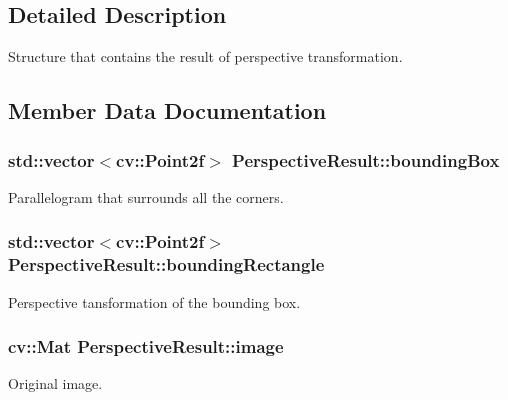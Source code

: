 \subsection{Detailed Description}
Structure that contains the result of perspective transformation. 

\subsection{Member Data Documentation}
\subsubsection[{\texorpdfstring{bounding\+Box}{boundingBox}}]{\setlength{\rightskip}{0pt plus 5cm}std\+::vector$<$cv\+::\+Point2f$>$ Perspective\+Result\+::bounding\+Box}\hypertarget{struct_perspective_result_a2780569aa3456b68798cad4697af8647}{}\label{struct_perspective_result_a2780569aa3456b68798cad4697af8647}
Parallelogram that surrounds all the corners. 
\subsubsection[{\texorpdfstring{bounding\+Rectangle}{boundingRectangle}}]{\setlength{\rightskip}{0pt plus 5cm}std\+::vector$<$cv\+::\+Point2f$>$ Perspective\+Result\+::bounding\+Rectangle}\hypertarget{struct_perspective_result_a78e1db1b132a9e364ab5f2c3b452b611}{}\label{struct_perspective_result_a78e1db1b132a9e364ab5f2c3b452b611}
Perspective tansformation of the bounding box. 
\subsubsection[{\texorpdfstring{image}{image}}]{\setlength{\rightskip}{0pt plus 5cm}cv\+::\+Mat Perspective\+Result\+::image}\hypertarget{struct_perspective_result_a0d73af1103688870135ebb3ff7bcdbdc}{}\label{struct_perspective_result_a0d73af1103688870135ebb3ff7bcdbdc}
Original image. 
